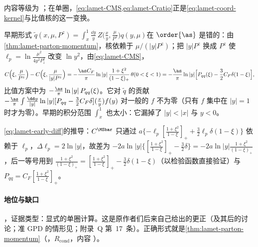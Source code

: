 内容等级为 \tagA；在单圈，\cref{eq:lamet-CMS,eq:lamet-Cratio}正是\cref{eq:lamet-coord-kernel}与比值核的这一变换。

\begin{remark}\label{rem:lamet-early-form}
早期形式 $\tilde q(x,\mu,P^z)=\int_x^1\frac{\dd y}y\,Z\big(\frac xy,\frac\mu{P^z}\big)q(y,\mu)$\cite[式~(11)]{Ji2013}在 $\order{\as}$ 是错的：由\cref{thm:lamet-parton-momentum}，核依赖于 $\mu/(|y|P^z)$；把 $|y|P^z$ 换成 $P^z$ 使 $\ell_p=\ln\frac{\mu^2}{4y^2P_z^2}$ 改变 $\ln y^2$，由\cref{eq:lamet-CMS}，
\begin{equation}\label{eq:lamet-early-diff}
C\Big(\xi,\frac\mu{P^z}\Big)-C\Big(\xi,\frac\mu{|y|P^z}\Big)=-\frac{\as C_F}\pi\ln|y|\,\frac{1+\xi^2}{(1-\xi)_+}\,\theta(0<\xi<1)=-\frac{\as}\pi\ln|y|\Big[P_{qq}(\xi)-\frac32C_F\delta(1-\xi)\Big],
\end{equation}%
比值方案中为 $-\frac{\as}\pi\ln|y|\,P_{qq}(\xi)$。它对 $\tilde q$ 的贡献 $-\frac{\as}\pi\int\frac{\dd y}{|y|}\ln|y|[P_{qq}-\frac32C_F\delta](\frac xy)f(y)$ 对一般的 $f$ 不为零（只有 $f$ 集中在 $|y|=1$ 时才为零）。早期的积分范围 $\int_x^1$ 也太小：它漏掉了 $|y|<|x|$ 与 $y<0$。
\end{remark}

\cref{eq:lamet-early-diff}的推导：$C^{\MSbar}$ 只通过 $a\{-\ell_p[\frac{1+\xi^2}{1-\xi}]_++\frac32\ell_p\delta(1-\xi)\}$ 依赖于 $\ell_p$，$\Delta\ell_p=2\ln|y|$，故差为 $-2a\ln|y|\{[\frac{1+\xi^2}{1-\xi}]_+-\frac32\delta\}=-2a\ln|y|\frac{1+\xi^2}{(1-\xi)_+}$，后一等号用到 $\frac{1+\xi^2}{(1-\xi)_+}=[\frac{1+\xi^2}{1-\xi}]_+-\frac32\delta(1-\xi)$（以检验函数直接验证）与 $P_{qq}=C_F[\frac{1+\xi^2}{1-\xi}]_+$。

\paragraph{地位与缺口}
\tagV，证据类型：显式的单圈计算\cite{IzubuchiEtAl2018}。这是原作者们后来自己给出的更正（\cite[式~(27)]{IzubuchiEtAl2018}及其后的讨论；准 GPD 的情形见\cite{Ji:2015qla}；附录~Q 第~17~条）。正确形式就是\cref{thm:lamet-parton-momentum}（\tagR，$R_{\mathrm{cond}}$，内容 \tagA）。

